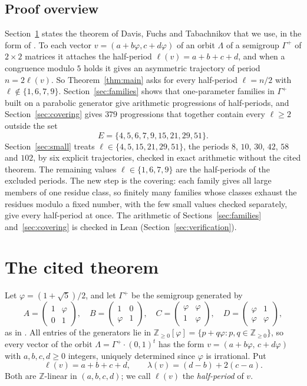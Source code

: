 \documentclass[11pt]{article}
\theoremstyle{definition}
\theoremstyle{remark}
\newcommand{\Gp}{\Gamma^{+}}
\begin{document}
\subsection{Proof overview}
Section~\ref{sec:cited} states the theorem of Davis, Fuchs and Tabachnikov
\cite[Theorem~11]{DFT} that we use, in the form of
\cite[Theorem~2.1]{KZ}. To each vector $v=(a+b\varphi,c+d\varphi)$ of an
orbit $\Lambda$ of a semigroup $\Gp$ of $2\times2$ matrices it attaches the
half-period $\ell(v)=a+b+c+d$, and when a congruence modulo $5$ holds it
gives an asymmetric trajectory of period $n=2\ell(v)$. So
Theorem~\ref{thm:main} asks for every half-period $\ell=n/2$ with
$\ell\notin\{1,6,7,9\}$. Section~\ref{sec:families} shows that
one-parameter families in $\Gp$ built on a parabolic generator give
arithmetic progressions of half-periods, and Section~\ref{sec:covering}
gives $379$ progressions that together contain every $\ell\ge2$ outside the
set
\[
E=\{4,5,6,7,9,15,21,29,51\}.
\]
Section~\ref{sec:small} treats $\ell\in\{4,5,15,21,29,51\}$, the periods
$8$, $10$, $30$, $42$, $58$ and $102$, by six explicit trajectories,
checked in exact arithmetic without the cited theorem. The remaining
values $\ell\in\{1,6,7,9\}$ are the half-periods of the excluded periods.
The new step is the covering: each family gives all large members of one
residue class, so finitely many families whose classes exhaust the
residues modulo a fixed number, with the few small values checked
separately, give every half-period at once. The arithmetic of
Sections~\ref{sec:families} and~\ref{sec:covering} is checked in Lean
(Section~\ref{sec:verification}).
\section{The cited theorem}\label{sec:cited}

Let $\varphi=(1+\sqrt5)/2$, and let $\Gp$ be the semigroup generated by
\[
A=\begin{pmatrix}1&\varphi\\0&1\end{pmatrix},\quad
B=\begin{pmatrix}1&0\\\varphi&1\end{pmatrix},\quad
C=\begin{pmatrix}\varphi&\varphi\\1&\varphi\end{pmatrix},\quad
D=\begin{pmatrix}\varphi&1\\\varphi&\varphi\end{pmatrix},
\]
as in \cite[\S2]{KZ}. All entries of the generators lie in
$\mathbb{Z}_{\ge0}[\varphi]=\{p+q\varphi: p,q\in\mathbb{Z}_{\ge0}\}$, so
every vector of the orbit $\Lambda=\Gp\cdot(0,1)^t$ has the form
$v=(a+b\varphi,\,c+d\varphi)$ with $a,b,c,d\ge0$ integers, uniquely
determined since $\varphi$ is irrational. Put
\[
\ell(v)=a+b+c+d,\qquad \lambda(v)=(d-b)+2(c-a).
\]
Both are $\mathbb{Z}$-linear in $(a,b,c,d)$; we call $\ell(v)$ the
\emph{half-period} of $v$.
\end{document}
